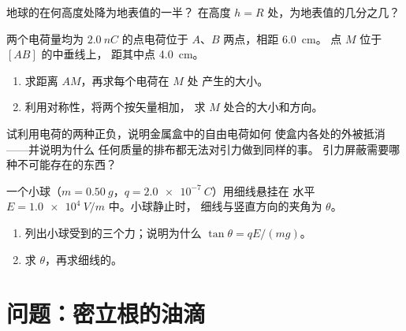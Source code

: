 \begin{exercise}[$\star\star\star$]\label{exo:g11:electric-gravitational-fields:12}
地球的在何高度处降为地表值的一半？
在高度 $h = R$ 处，为地表值的几分之几？
\end{exercise}

\begin{exercise}[$\star\star\star$]\label{exo:g11:electric-gravitational-fields:13}
两个电荷量均为 $\qty{+2.0}{nC}$ 的点电荷位于 $A$、$B$ 两点，相距 \qty{6.0}{cm}。
点 $M$ 位于 $[AB]$ 的中垂线上，
距其中点 \qty{4.0}{cm}。
\begin{enumerate}
  \item 求距离 $AM$，再求每个电荷在 $M$ 处
        产生的大小。
  \item 利用对称性，将两个按矢量相加，
        求 $M$ 处合的大小和方向。
\end{enumerate}
\end{exercise}

\begin{exercise}[$\star\star\star$]\label{exo:g11:electric-gravitational-fields:14}
试利用电荷的两种正负，说明金属盒中的自由电荷如何
使盒内各处的外被抵消——并说明为什么
任何质量的排布都无法对引力做到同样的事。
引力屏蔽需要哪种不可能存在的东西？
\end{exercise}

\begin{exercise}[$\star\star\star$]\label{exo:g11:electric-gravitational-fields:15}
一个小球（$m = \qty{0.50}{g}$，$q = \qty{+2.0e-7}{C}$）用细线悬挂在
水平 $E = \qty{1.0e4}{V/m}$ 中。小球静止时，
细线与竖直方向的夹角为 $\theta$。
\begin{enumerate}
  \item 列出小球受到的三个力；说明为什么 $\tan\theta = qE / (mg)$。
  \item 求 $\theta$，再求细线的。
\end{enumerate}
\end{exercise}

\section{问题：密立根的油滴}

